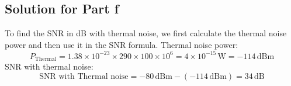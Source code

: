 \documentclass{article}
\begin{document}
\subsection*{Solution for Part f}
To find the SNR in dB with thermal noise, we first calculate the thermal noise power and then use it in the SNR formula.
Thermal noise power:
\[
P_{\text{Thermal}} = 1.38 \times 10^{-23} \times 290 \times 100 \times 10^6 = 4 \times 10^{-15} \, \text{W} = -114 \, \text{dBm}
\]
SNR with thermal noise:
\[
\text{SNR with Thermal noise} = -80 \, \text{dBm} - (-114 \, \text{dBm}) = 34 \, \text{dB}
\]

\newpage
\end{document}
